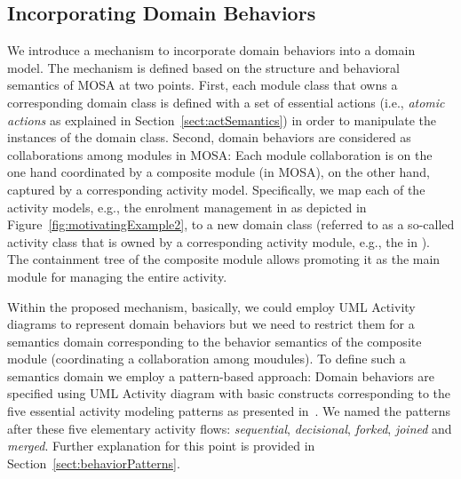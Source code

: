 \subsection{Incorporating Domain Behaviors} 
\label{subsect:domainBehaviors}

We introduce a mechanism to incorporate domain behaviors into a domain model. The mechanism is defined based on the structure and behavioral semantics of MOSA at two points. %
%
First, each module class that owns a corresponding domain class  is defined with a set of essential actions (i.e., \textit{atomic actions} as explained in Section~\ref{sect:actSemantics}) in order to manipulate the instances of the domain class. %
%
Second, domain behaviors are considered as collaborations among modules in MOSA: Each module collaboration is on the one hand coordinated by a composite module (in MOSA), on the other hand, captured by a corresponding activity model. Specifically, we map each of the activity models, e.g., the enrolment management in \courseman as depicted in Figure~\ref{fig:motivatingExample2}, to a new domain class (referred to as a so-called activity class that is owned by a corresponding activity module, e.g., the  in \courseman). The containment tree of the composite module allows promoting it as the main module for managing the entire activity.

Within the proposed mechanism, basically, we could employ UML Activity diagrams to represent domain behaviors but we need to restrict them for a semantics domain corresponding to the behavior semantics of the composite module (coordinating a collaboration among moudules). To define such a semantics domain we employ a pattern-based approach: Domain behaviors are specified using UML Activity diagram with basic constructs corresponding to the five essential activity modeling patterns as presented in~\cite{le_domain_2018}. We named the patterns after these five elementary activity flows: \textit{sequential}, \textit{decisional}, \textit{forked}, \textit{joined} and \textit{merged}. Further explanation for this point is provided in Section~\ref{sect:behaviorPatterns}.

